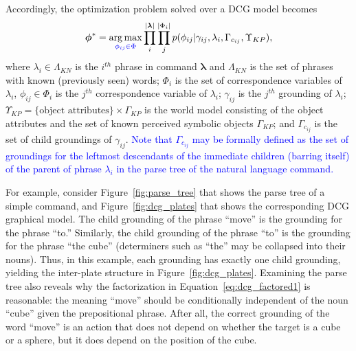 Accordingly, the optimization problem solved over a DCG model becomes
\begin{equation}
\label{eq:dcg_factored1}
\begin{split}
\boldsymbol{\phi}^* = \operatorname*{\arg\max}_{\textcolor{blue}{\phi_{ij} \in \Phi}} \prod_{i}^{|\boldsymbol{\lambda}|} \prod_{j}^{|\Phi_i|} p(\phi_{ij}|\gamma_{ij},\lambda_i,\Gamma_{c_{ij}} , \Upsilon_{KP}),
\end{split}
\end{equation}
where $\lambda_i \in \Lambda_{KN}$ is the $i^{th}$ phrase in command $\boldsymbol{\lambda}$ and $\Lambda_{KN}$ is the set of phrases with known (previously seen) words; $\Phi_i$ is the set of correspondence variables of $\lambda_i$, $\phi_{ij} \in \Phi_i$ is the $j^{th}$ correspondence variable of $\lambda_i$; $\gamma_{ij}$ is the $j^{th}$ grounding of $\lambda_i$; $\Upsilon_{KP} = \{\text{object attributes}\} \times \Gamma_{KP}$ is the world model consisting of the object attributes and the set of known perceived symbolic objects $\Gamma_{KP}$; and  $\Gamma_{c_{ij}}$ is the set of child groundings of $\gamma_{ij}$. \textcolor{blue}{Note that $\Gamma_{c_{ij}}$ may be formally defined as the set of groundings for the leftmost descendants of the immediate children (barring itself) of the parent of phrase $\lambda_i$ in the parse tree of the natural language command.} 

For example, consider Figure~\ref{fig:parse_tree} that shows the parse tree of a simple command, and Figure~\ref{fig:dcg_plates} that shows the corresponding DCG graphical model. The child grounding of the phrase ``move'' is the grounding for the phrase ``to.'' Similarly, the child grounding of the phrase ``to'' is the grounding for the phrase ``the cube'' (determiners such as ``the'' may be collapsed into their nouns). Thus, in this example, each grounding has exactly one child grounding, yielding the inter-plate structure in Figure~\ref{fig:dcg_plates}.
Examining the parse tree also reveals why the factorization in Equation~\ref{eq:dcg_factored1} is reasonable: the meaning ``move'' should be conditionally independent of the noun ``cube'' given the prepositional phrase.
After all, the correct grounding of the word ``move'' is an action that does not depend on whether the target is a cube or a sphere, but it does depend on the position of the cube.


